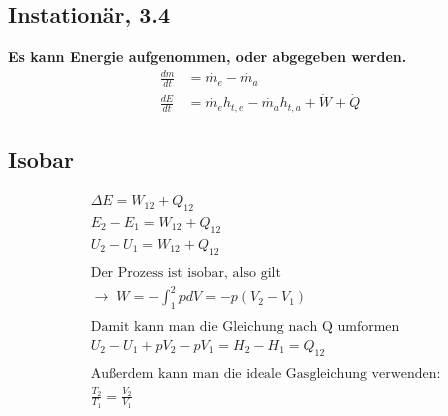 \documentclass[12pt]{article}
\begin{document}
\subsection{Instationär, 3.4}
\bigskip
\textbf{Es kann Energie aufgenommen, oder abgegeben werden.}
\begin{align*}
\frac{dm}{dt}&=\dot{m_e}-\dot{m_a}\\
\frac{dE}{dt}&=\dot{m_e}h_{t,e}-\dot{m_a}h_{t,a}+\dot{W}+\dot{Q}
\end{align*}

\subsection{Isobar}

\begin{tcolorbox}[colback=backblue,colframe=borderblue,title=Important]
\begin{align*}
&\Delta E=W_{12}+Q_{12}\\
&E_2-E_1=W_{12}+Q_{12}\\
&U_2-U_1=W_{12}+Q_{12}\\ \\
&\text{Der Prozess ist isobar, also gilt} \\
&\rightarrow \; W=-\int_1^2pdV=-p(V_2-V_1)\\ \\
&\text{Damit kann man die Gleichung nach Q umformen} \\
&U_2-U_1+pV_2-pV_1=H_2-H_1=Q_{12}\\ \\
&\text{Außerdem kann man die ideale Gasgleichung verwenden:}\\
&\frac{T_2}{T_1}=\frac{V_2}{V_1}
\end{align*}
\end{tcolorbox}
\pagebreak
\end{document}
